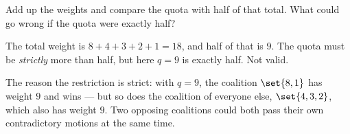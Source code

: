 \documentclass[12pt]{ximera}
\begin{document}
\begin{problem}
\begin{prompt}
\begin{hint}
Add up the weights and compare the quota with half of that total. What could go wrong
if the quota were exactly half?
\end{hint}

\begin{feedback}
The total weight is $8+4+3+2+1 = 18$, and half of that is $9$. The quota must be
\emph{strictly} more than half, but here $q = 9$ is exactly half. Not valid.

The reason the restriction is strict: with $q=9$, the coalition $\set{8,1}$ has weight
$9$ and wins --- but so does the coalition of everyone else, $\set{4,3,2}$, which also
has weight $9$. Two opposing coalitions could both pass their own contradictory
motions at the same time.
\end{feedback}
\end{prompt}
\end{problem}
\end{document}
